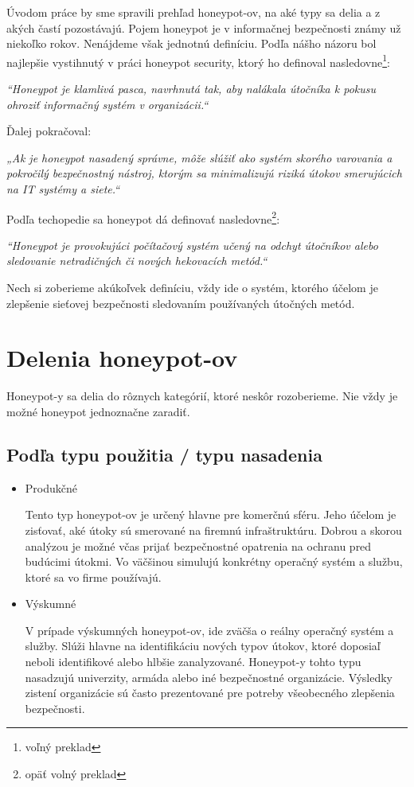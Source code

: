 \documentclass[12pt, oneside]{book}
\begin{document}
Úvodom práce by sme spravili prehľad honeypot-ov, na aké typy sa delia a z akých častí pozostávajú.
Pojem honeypot je v informačnej bezpečnosti známy už niekoľko rokov.
Nenájdeme však jednotnú definíciu.
Podľa nášho názoru bol najlepšie vystihnutý v práci honeypot security\cite{hongkong}, ktorý ho definoval nasledovne\footnote{voľný preklad}:

\textit{“Honeypot je klamlivá pasca, navrhnutá tak, aby nalákala útočníka k pokusu ohroziť informačný systém v organizácii.“}

Ďalej pokračoval:

\textit{„Ak je honeypot nasadený správne, môže slúžiť ako systém skorého varovania a pokročilý bezpečnostný nástroj, ktorým sa minimalizujú riziká útokov smerujúcich na IT systémy a siete.“}

Podľa techopedie\cite{technopedia} sa honeypot dá definovať nasledovne\footnote{opäť volný preklad}:

\textit{“Honeypot je provokujúci počítačový systém učený na odchyt útočníkov alebo sledovanie netradičných či nových hekovacích metód.“}

Nech si zoberieme akúkoľvek definíciu, vždy ide o systém, ktorého účelom je zlepšenie sieťovej bezpečnosti sledovaním používaných útočných metód.

\section{Delenia honeypot-ov}

Honeypot-y sa delia do rôznych kategórií, ktoré neskôr rozoberieme. Nie vždy je možné honeypot jednoznačne zaradiť.

\subsection{Podľa typu použitia / typu nasadenia}

\begin{itemize}

\item{Produkčné}

Tento typ honeypot-ov je určený hlavne pre komerčnú sféru.
Jeho účelom je zisťovať, aké útoky sú smerované na firemnú infraštruktúru.
Dobrou a skorou analýzou je možné včas prijať bezpečnostné opatrenia na ochranu pred budúcimi útokmi.
Vo väčšinou simulujú konkrétny operačný systém a službu, ktoré sa vo firme používajú.

\item{Výskumné}

V prípade výskumných honeypot-ov, ide zväčša o reálny operačný systém a služby.
Slúži hlavne na identifikáciu nových typov útokov, ktoré doposiaľ neboli identifikové alebo hlbšie zanalyzované.
Honeypot-y tohto typu nasadzujú univerzity, armáda alebo iné bezpečnostné organizácie.
Výsledky zistení organizácie sú často prezentované pre potreby všeobecného zlepšenia bezpečnosti.

\end{itemize}
\end{document}

